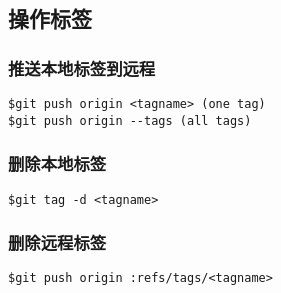 \subsection{操作标签}
\subsubsection{推送本地标签到远程}
\begin{lstlisting}
$git push origin <tagname> (one tag)
$git push origin --tags (all tags)
\end{lstlisting}

\subsubsection{删除本地标签}
\begin{lstlisting}
$git tag -d <tagname>
\end{lstlisting}

\subsubsection{删除远程标签}
\begin{lstlisting}
$git push origin :refs/tags/<tagname>
\end{lstlisting} 